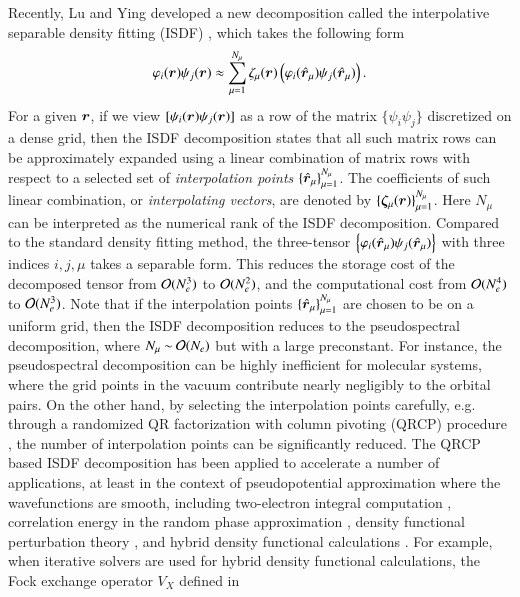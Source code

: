 Recently, Lu and Ying developed a new decomposition called the interpolative
separable density fitting (ISDF) \cite{JCP_302_329_2015_ISDF}, which takes the
following form
\begin{equation}\label{eqn:isdfformat}
  \varphi_{i}(\bm{r})  \psi_{j}(\bm{r})\approx \sum_{\mu=1}^{N_{\mu}}
  \zeta_{\mu}(\bm{r}) \left(\varphi_{i}(\smash{\hat{\bm{r}}}_\mu)\psi_{j}(\smash{\hat{\bm{r}}}_\mu)\right).
\end{equation}
For a given $\bm{r}$, if we view $[\psi_{i}(\bm{r})\psi_{j}(\bm{r})]$ as a row
of the matrix $\{\psi_{i}\psi_{j}\}$ discretized on a dense grid, then the ISDF
decomposition states that all such matrix rows can be approximately expanded
using a linear combination of matrix rows with respect to a selected set of 
\textit{interpolation points} $\{\smash{\hat{\bm{r}}}_\mu\}_{\mu=1}^{N_{\mu}}$.  The
coefficients of such linear combination, or \textit{interpolating vectors}, are
denoted by $\{\bm{\zeta}_{\mu}(\bm{r})\}_{\mu=1}^{N_{\mu}}$. Here $N_{\mu}$ can be
interpreted as the numerical rank of the ISDF decomposition. Compared to the
standard density fitting method, the three-tensor $\left\{\varphi_{i}
(\smash{\hat{\bm{r}}}_\mu)\psi_{j}(\smash{\hat{\bm{r}}}_\mu)\right\}$ with three indices $i, j, \mu$ takes a
separable form. This reduces the storage cost of the decomposed tensor from
$\mathcal{O}(N_{e}^3)$ to $\mathcal{O}(N_{e}^2)$, and the computational cost from $\mathcal{O}(N_
{e}^{4})$ to $\mathcal{O}(N_{e}^3)$. Note that if the interpolation points $
\{\smash{\hat{\bm{r}}}_\mu\}_{\mu=1}^{N_{\mu}}$ are chosen to be on a uniform grid, then the ISDF decomposition reduces to the pseudospectral decomposition, where $N_
{\mu}\mathbin{\sim}\mathcal{O}(N_{e})$ but with a large preconstant. For instance, the
pseudospectral decomposition can be highly inefficient for molecular systems,
where the grid points in the vacuum contribute nearly negligibly to the orbital
pairs. On the other hand, by selecting the interpolation points carefully, e.g.
through a randomized QR factorization with column pivoting (QRCP) procedure 
\cite{GolubVan2013}, the number of interpolation points can be significantly
reduced. The QRCP based ISDF decomposition has been applied to accelerate a
number of applications, at least in the context of pseudopotential approximation
where the wavefunctions are smooth, including two-electron integral computation 
\cite{JCP_302_329_2015_ISDF}, correlation energy in the random phase
approximation \cite{LuThicke2017}, density functional perturbation theory 
\cite{LinXuYing2017}, and hybrid density functional calculations 
\cite{JCTC_2017_ISDF}. For example, when iterative solvers are used for hybrid
density functional calculations, the Fock exchange operator $V_{X}$ defined in
